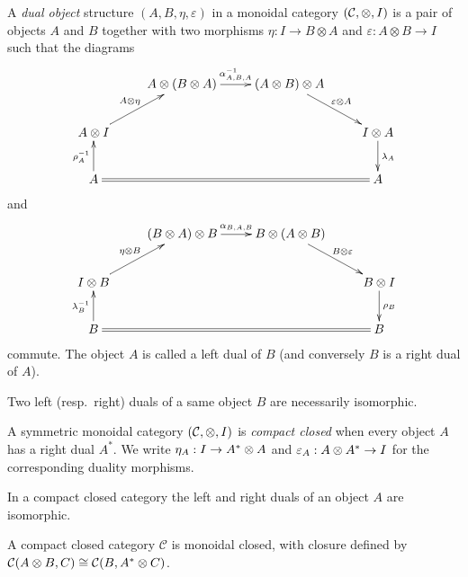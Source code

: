 \begin{definition}
A \emph{dual object} structure $(A,B,\eta,\varepsilon)$ in a monoidal category $(\mathcal{C},\otimes,I)$ is a pair of objects $A$ and $B$ together with two morphisms
$\eta:I\to B\otimes A$ and $\varepsilon:A\otimes B\to I$
such that the diagrams
\begin{equation*}
\xymatrix{
& A\tens(B\tens A)\ar[r]^{\alpha_{A,B,A}^{-1}}& (A\tens B)\tens A\ar[dr]^{\varepsilon\tens A}\\
A\tens I\ar[ur]^{A\tens\eta}& & & I\tens A\ar[d]^{\lambda_A}\\
A\ar[u]^{\rho_A^{-1}}\ar@{=}[rrr]& & & A\\
}
\end{equation*}
and
\begin{equation*}
\xymatrix{
& (B\tens A)\tens B\ar[r]^{\alpha_{B,A,B}}& B\tens(A\tens B)\ar[dr]^{B\tens\varepsilon}\\
I\tens B\ar[ur]^{\eta\tens B}& & & B\tens I\ar[d]^{\rho_B}\\
B\ar[u]^{\lambda_B^{-1}}\ar@{=}[rrr]& & & B\\
}
\end{equation*}
commute. The object $A$ is called a left dual of $B$ (and conversely $B$ is a right dual of $A$).
\end{definition}

\begin{lemma}
Two left (resp.\ right) duals of a same object $B$ are necessarily isomorphic.
\end{lemma}

\begin{definition}
A symmetric monoidal category $(\mathcal{C},\otimes,I)$ is \emph{compact closed} when every object $A$ has a right dual $A^*$. We write
$\eta_A:I\to A^*\otimes A$ and $\varepsilon_A:A\otimes A^*\to I$
for the corresponding duality morphisms.
\end{definition}

\begin{lemma}
In a compact closed category the left and right duals of an object $A$ are isomorphic.
\end{lemma}

\begin{property}
A compact closed category $\mathcal{C}$ is monoidal closed, with closure defined by
$\mathcal{C}(A\otimes B,C)\cong\mathcal{C}(B,A^*\otimes C)$.
\end{property}

